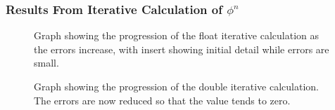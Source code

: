 \documentclass[11pt]{article} %
\newcommand{\inputTikZ}[1]{%
  }
\newcommand{\inputTikZ}[1]{%
    \beginpgfgraphicnamed{#1-external}%
    \endpgfgraphicnamed%
  }
\begin{document}
		\subsubsection{Results From Iterative Calculation of $\phi^n$}
		\begin{figure}[htbp]
			\begin{minipage}{0.65\linewidth}
				\centering
					\inputTikZ{float1}
			\end{minipage}%
			\begin{minipage}{0.35\linewidth}
				\centering
					\inputTikZ{float2}
			\end{minipage}
			\caption{\label{fig:float}Graph showing the progression of the float iterative calculation as the errors increase, with insert showing initial detail while errors are small.}
		\end{figure}
		\begin{figure}[h]
			\centering
				\inputTikZ{double}
			\caption{\label{fig:double}Graph showing the progression of the double iterative calculation. The errors are now reduced so that the value tends to zero.}
		\end{figure}
\end{document}
